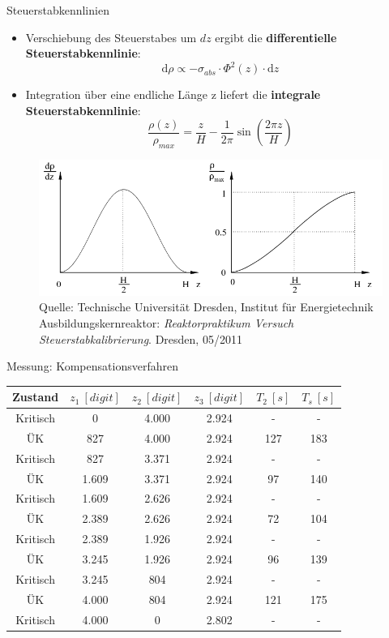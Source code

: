 \documentclass[10pt]{beamer}
\begin{document}
 		\begin{frame}{Steuerstabkennlinien}
 			\begin{itemize}
 			 	\item Verschiebung des Steuerstabes um $dz$ ergibt die \textbf{differentielle Steuerstabkennlinie}:
 			 		\begin{equation*}
 			 			\mathrm{d}\rho \propto - \sigma_{abs} \cdot \Phi^2(z) \cdot \mathrm{d}z
 			 		\end{equation*}
 			 	\item Integration über eine endliche Länge z liefert die \textbf{integrale Steuerstabkennlinie}:
 			 		$$\frac{\rho(z)}{\rho_{max}} = \frac{z}{H} - \frac{1}{2\pi} \sin{\left(\frac{2\pi z}{H}\right)}$$
 			\end{itemize}
 			\begin{figure}
 			 	\includegraphics[width=0.6\linewidth]{pic/sskl}\\
 			 	\tiny{Quelle: Technische Universität Dresden,  Institut für Energietechnik Ausbildungskernreaktor: \textit{Reaktorpraktikum Versuch \glqq Steuerstabkalibrierung\grqq}. Dresden, 05/2011}
 			 \end{figure}
 		\end{frame}
 		
 		\begin{frame}{Messung: Kompensationsverfahren}
 			\begin{table}
 				\begin{tabular}{c|c|c|c|c|c}
 				    	Zustand	&	$z_1\ [\unit{digit}]$	&	$z_2\ [\unit{digit}]$	&	$z_3\ [\unit{digit}]$	&	$T_2\ [\unit{s}]$	&	$T_s\ [\unit{s}]$\\
 				    	\hline
 				    	Kritisch	&	0		&	4.000	&	2.924	&	-	&	-	\\
 				    	ÜK			&	827		&	4.000	&	2.924	&	127	&	183\\
 				    	Kritisch	&	827		&	3.371	&	2.924	&	-	&	-\\
 				    	ÜK			&	1.609	&	3.371	&	2.924	&	97	&	140\\
 				    	Kritisch	&	1.609	&	2.626	&	2.924	&	-	&	-\\
 				    	ÜK			&	2.389	&	2.626	&	2.924	&	72	&	104\\
 				    	Kritisch	&	2.389	&	1.926	&	2.924	&	-	&	-\\
 				    	ÜK			&	3.245	&	1.926	&	2.924	&	96	&	139\\
 				    	Kritisch	&	3.245	&	804		&	2.924	&	-	&	-\\
 				    	ÜK			&	4.000	&	804		&	2.924	&	121	&	175\\
 				    	Kritisch	&	4.000	&	0		&	2.802	&	-	&	-	
 				    	\end{tabular}
 			\end{table}	
 		\end{frame}
 		
\end{document}
